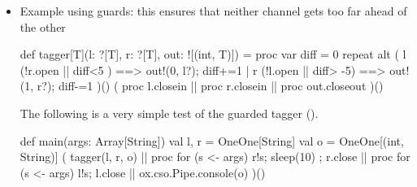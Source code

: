 \documentclass{concdistfoils}
\begin{document}
\begin{slide}
\begin{itemize}
\item Example using guards: this ensures that neither channel gets too far ahead of the other
\vfill
\begin{hideobj}{csoexamples/Tagger2}
package csoexamples

object Tagger2
{ import ox.CSO._
  
\end{hideobj}
\begin{obj}{}
  def tagger[T](l: ?[T], r: ?[T], out: ![(int, T)]) = proc
  { var diff = 0
    repeat
    {   alt ( l  (!r.open || diff<5 )  ==> { out!(0, l?); diff+=1 }
            | r  (!l.open || diff> -5) ==> { out!(1, r?); diff-=1 }
            )()
    }
    ( proc {l.closein} || proc {r.closein} || proc {out.closeout} )()  
  }
\end{obj}
\begin{note} 
The following is a very simple test of the guarded tagger ().

\begin{obj}{}
  def main(args: Array[String])
  { val l, r = OneOne[String]
    val o    = OneOne[(int, String)]
    (  tagger(l, r, o)
    || proc { for (s <- args) { r!s; sleep(10) } ; r.close }
    || proc { for (s <- args) l!s; l.close }
    || ox.cso.Pipe.console(o)
    )()
  }
\end{obj}
\end{note}
\begin{hideobj}{}
}
\end{hideobj}

\end{itemize}
\end{slide}
\end{document}
